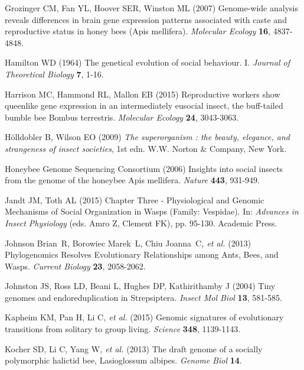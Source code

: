 \documentclass[]{article}
\begin{document}
\protect\hypertarget{ux5fENREFux5f16}{}{}Grozinger CM, Fan YL, Hoover
SER, Winston ML (2007) Genome-wide analysis reveals differences in brain
gene expression patterns associated with caste and reproductive status
in honey bees (Apis mellifera). \emph{Molecular Ecology} \textbf{16},
4837-4848.

\protect\hypertarget{ux5fENREFux5f17}{}{}Hamilton WD (1964) The
genetical evolution of social behaviour. I. \emph{Journal of Theoretical
Biology} \textbf{7}, 1-16.

\protect\hypertarget{ux5fENREFux5f18}{}{}Harrison MC, Hammond RL, Mallon
EB (2015) Reproductive workers show queenlike gene expression in an
intermediately eusocial insect, the buff-tailed bumble bee Bombus
terrestris. \emph{Molecular Ecology} \textbf{24}, 3043-3063.

\protect\hypertarget{ux5fENREFux5f19}{}{}Hölldobler B, Wilson EO (2009)
\emph{The superorganism : the beauty, elegance, and strangeness of
insect societies}, 1st edn. W.W. Norton \& Company, New York.

\protect\hypertarget{ux5fENREFux5f20}{}{}Honeybee Genome Sequencing
Consortium (2006) Insights into social insects from the genome of the
honeybee Apis mellifera. \emph{Nature} \textbf{443}, 931-949.

\protect\hypertarget{ux5fENREFux5f21}{}{}Jandt JM, Toth AL (2015)
Chapter Three - Physiological and Genomic Mechanisms of Social
Organization in Wasps (Family: Vespidae). In: \emph{Advances in Insect
Physiology} (eds. Amro Z, Clement FK), pp. 95-130. Academic Press.

\protect\hypertarget{ux5fENREFux5f22}{}{}Johnson Brian~R, Borowiec
Marek~L, Chiu Joanna~C\emph{, et al.} (2013) Phylogenomics Resolves
Evolutionary Relationships among Ants, Bees, and Wasps. \emph{Current
Biology} \textbf{23}, 2058-2062.

\protect\hypertarget{ux5fENREFux5f23}{}{}Johnston JS, Ross LD, Beani L,
Hughes DP, Kathirithamby J (2004) Tiny genomes and endoreduplication in
Strepsiptera. \emph{Insect Mol Biol} \textbf{13}, 581-585.

\protect\hypertarget{ux5fENREFux5f24}{}{}Kapheim KM, Pan H, Li C\emph{,
et al.} (2015) Genomic signatures of evolutionary transitions from
solitary to group living. \emph{Science} \textbf{348}, 1139-1143.

\protect\hypertarget{ux5fENREFux5f25}{}{}Kocher SD, Li C, Yang W\emph{,
et al.} (2013) The draft genome of a socially polymorphic halictid bee,
Lasioglossum albipes. \emph{Genome Biol} \textbf{14}.
\end{document}
